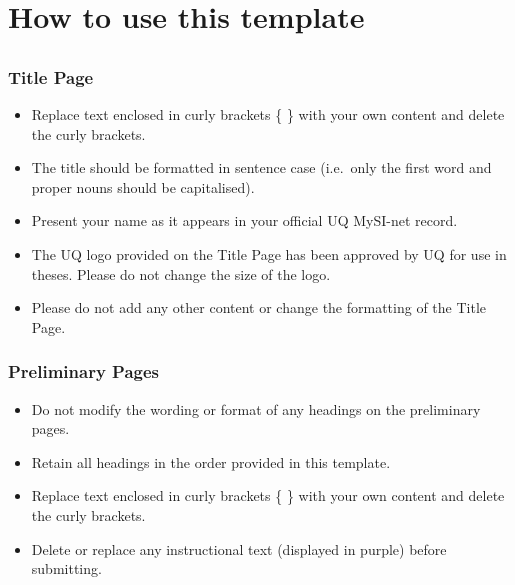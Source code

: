 \documentclass[12pt,openany,a4paper]{book}
\begin{document}
{\color{topicpurple}\itshape

\chapter*{How to use this template}
\section*{ }
\subsection*{Title Page}
\begin{itemize}
  \item Replace text enclosed in curly brackets \{ \} with your own content and delete the curly brackets.
  \item The title should be formatted in sentence case (i.e.\ only the first word and proper nouns should be capitalised).
  \item Present your name as it appears in your official UQ MySI-net record.
  \item The UQ logo provided on the Title Page has been approved by UQ for use in theses. Please do not change the size of the logo.
  \item Please do not add any other content or change the formatting of the Title Page.
\end{itemize}

\subsection*{Preliminary Pages}
\begin{itemize}
  \item Do not modify the wording or format of any headings on the preliminary pages.
  \item Retain all headings in the order provided in this template.
  \item Replace text enclosed in curly brackets \{ \} with your own content and delete the curly brackets. 
  \item Delete or replace any instructional text (displayed in purple) before submitting.
\end{itemize}

}
\end{document}
